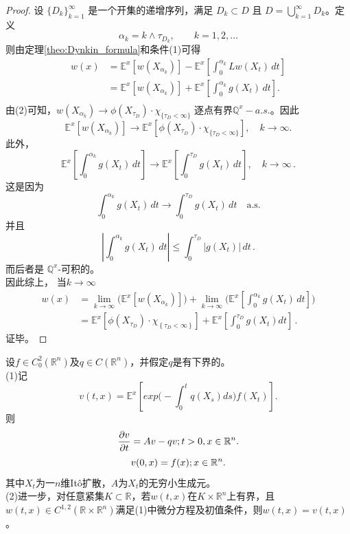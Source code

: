\documentclass[oneside]{sysuthesis}
\begin{document}
\begin{proof}
	设 $\{D_k\}_{k=1}^\infty$ 是一个开集的递增序列，满足 $D_k \subset D$ 且 $D = \bigcup_{k=1}^\infty D_k$。定义
	\[
	\alpha_k = k \wedge \tau_{D_k}, \qquad k=1,2,\dots
	\]
	则由定理\ref{theo:Dynkin_formula}和条件(1)可得
	\[
	\begin{aligned}
		w(x) &= \mathbb{E}^x[w(X_{\alpha_k})] - \mathbb{E}^x\left[ \int_0^{\alpha_k} Lw(X_t)\, dt \right]\\
		&= \mathbb{E}^x[w(X_{\alpha_k})] + \mathbb{E}^x\left[ \int_0^{\alpha_k} g(X_t)\, dt \right].\\
	\end{aligned}
	\]
	由(2)可知，$w(X_{\alpha_k}) \to \phi(X_{\tau_D}) \cdot \chi_{\{\tau_D < \infty\}}$ 逐点有界$\mathbb{Q}^x-a.s.$。因此
	\[
	\mathbb{E}^x[w(X_{\alpha_k})] \to \mathbb{E}^x[\phi(X_{\tau_D}) \cdot \chi_{\{\tau_D < \infty\}}], \quad  k \to \infty.
	\]
	\hspace*{2em}此外，
	\[
	\mathbb{E}^x\left[ \int_0^{\alpha_k} g(X_t)\, dt \right] \to \mathbb{E}^x\left[ \int_0^{\tau_D} g(X_t)\, dt \right], \quad  k \to \infty\,.
	\]
	这是因为
	\[
	\int_0^{\alpha_k} g(X_t)\, dt \to \int_0^{\tau_D} g(X_t)\, dt \quad \text{a.s.}
	\]
	并且
	\[
	\left| \int_0^{\alpha_k} g(X_t)\, dt \right| \leq \int_0^{\tau_D} |g(X_t)|\, dt\,.
	\]
	而后者是 $\mathbb{Q}^x$-可积的。\\
	\hspace*{2em}因此综上， 当$k\to\infty$
	\[
	\begin{aligned}
		w(x)&= \lim_{k\to\infty}\Big(\mathbb{E}^x[w(X_{\alpha_k})]\Big) + \lim_{k\to\infty}\Big(\mathbb{E}^x\left[ \int_0^{\alpha_k} g(X_t)\, dt \right]\Big)\\
		&=\mathbb{E}^x\left[\phi(X_{\tau_D})\cdot\chi_{\left\{\tau_D<\infty\right\}}\right]+\mathbb{E}^x\left[\int_{0}^{\tau_D}g(X_t)dt\right]\,.
	\end{aligned}
	\]
	证毕。
\end{proof}

\begin{theorem}\label{theo:Feynman-Kac_formula}
	设$f\in C_0^2(\mathbb{R}^n)$及$q\in C(\mathbb{R}^n)$，并假定$q$是有下界的。\\
	\noindent(1)记
	\[
	v(t,x)=\mathbb{E}^x\left[exp\bigg(-\int_{0}^{t}q(X_s)ds\bigg)f(X_t)\right].
	\]
	则
	\[
	\frac{\partial v}{\partial t}=Av-qv;\vspace*{0.5cm}t>0,x\in\mathbb{R}^n.
	\]
	\[
	v(0,x)=f(x);\vspace*{0.5cm}x\in\mathbb{R}^n.
	\]
	其中$X_t$为一$n$维It\^o扩散，$A$为$X_t$的无穷小生成元。\\
	\noindent(2)进一步，对任意紧集$K\subset\mathbb{R}$，若$w(t,x)$在$K\times\mathbb{R}^n$上有界，且$w(t,x)\in C^{1,2}(\mathbb{R}\times\mathbb{R}^n)$满足(1)中微分方程及初值条件，则$w(t,x)=v(t,x)$。
\end{theorem}
\end{document}
